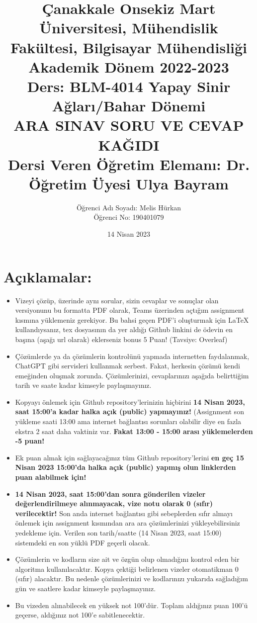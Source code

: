 \documentclass[11pt]{article}
\title{Çanakkale Onsekiz Mart Üniversitesi, Mühendislik Fakültesi, Bilgisayar Mühendisliği Akademik Dönem 2022-2023\\
Ders: BLM-4014 Yapay Sinir Ağları/Bahar Dönemi\\ 
ARA SINAV SORU VE CEVAP KAĞIDI\\
Dersi Veren Öğretim Elemanı: Dr. Öğretim Üyesi Ulya Bayram}
\author{%
\begin{minipage}{\textwidth}
\raggedright
Öğrenci Adı Soyadı: Melis Hürkan\\ %
Öğrenci No: 190401079
\end{minipage}%
}
\date{14 Nisan 2023}
\begin{document}
\maketitle

\vspace{-.5in}
\section*{Açıklamalar:}
\begin{itemize}
    \item Vizeyi çözüp, üzerinde aynı sorular, sizin cevaplar ve sonuçlar olan versiyonunu bu formatta PDF olarak, Teams üzerinden açtığım assignment kısmına yüklemeniz gerekiyor. Bu bahsi geçen PDF'i oluşturmak için LaTeX kullandıysanız, tex dosyasının da yer aldığı Github linkini de ödevin en başına (aşağı url olarak) eklerseniz bonus 5 Puan! (Tavsiye: Overleaf)
    \item Çözümlerde ya da çözümlerin kontrolünü yapmada internetten faydalanmak, ChatGPT gibi servisleri kullanmak serbest. Fakat, herkesin çözümü kendi emeğinden oluşmak zorunda. Çözümlerinizi, cevaplarınızı aşağıda belirttiğim tarih ve saate kadar kimseyle paylaşmayınız. 
    \item Kopyayı önlemek için Github repository'lerinizin hiçbirini \textbf{14 Nisan 2023, saat 15:00'a kadar halka açık (public) yapmayınız!} (Assignment son yükleme saati 13:00 ama internet bağlantısı sorunları olabilir diye en fazla ekstra 2 saat daha vaktiniz var. \textbf{Fakat 13:00 - 15:00 arası yüklemelerden -5 puan!}
    \item Ek puan almak için sağlayacağınız tüm Github repository'lerini \textbf{en geç 15 Nisan 2023 15:00'da halka açık (public) yapmış olun linklerden puan alabilmek için!}
    \item \textbf{14 Nisan 2023, saat 15:00'dan sonra gönderilen vizeler değerlendirilmeye alınmayacak, vize notu olarak 0 (sıfır) verilecektir!} Son anda internet bağlantısı gibi sebeplerden sıfır almayı önlemek için assignment kısmından ara ara çözümlerinizi yükleyebilirsiniz yedekleme için. Verilen son tarih/saatte (14 Nisan 2023, saat 15:00) sistemdeki en son yüklü PDF geçerli olacak.
    \item Çözümlerin ve kodların size ait ve özgün olup olmadığını kontrol eden bir algoritma kullanılacaktır. Kopya çektiği belirlenen vizeler otomatikman 0 (sıfır) alacaktır. Bu nedenle çözümlerinizi ve kodlarınızı yukarıda sağladığım gün ve saatlere kadar kimseyle paylaşmayınız.
    \item Bu vizeden alınabilecek en yüksek not 100'dür. Toplam aldığınız puan 100'ü geçerse, aldığınız not 100'e sabitlenecektir.

\end{itemize}
\end{document}
